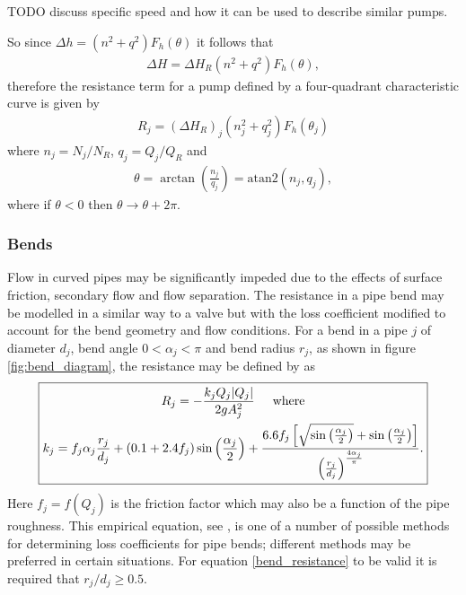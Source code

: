 \documentclass[12pt]{article}
\begin{document}
{\color{red} TODO discuss specific speed and how it can be used to describe similar pumps.}

So since $\Delta h = \left(n^2 + q^2 \right) F_h(\theta)$ it follows that 
\begin{align}
\Delta H = \Delta H_R \left(n^2 + q^2 \right) F_h(\theta),
\end{align}
therefore the resistance term for a pump defined by a four-quadrant characteristic curve is given by 
\begin{align}\label{pump_resistance}
\boxed{ R_j = \left( \Delta H_R \right)_j \left(n_j^2 + q_j^2 \right) F_h(\theta_j) }
\end{align}
where $n_j = N_j / N_R$, $q_j = Q_j / Q_R$ and 
\begin{align*}
\theta = \arctan\left(\frac{n_j}{q_j} \right) = \text{atan2}(n_j, q_j),
\end{align*}
where if $\theta < 0$ then $\theta \rightarrow \theta + 2 \pi$. 

\subsubsection{Bends} 

Flow in curved pipes may be significantly impeded due to the effects of surface friction, secondary flow and flow separation. The resistance in a pipe bend may be modelled in a similar way to a valve but with the loss coefficient modified to account for the bend geometry and flow conditions. For a bend in a pipe $j$ of diameter $d_j$, bend angle $0 < \alpha_j < \pi$ and bend radius $r_j$, as shown in figure \ref{fig:bend_diagram}, the resistance may be defined by as
\begin{align}\label{bend_resistance}
\boxed{
  \!\begin{gathered}
  R_j = - \frac{k_j Q_j|Q_j| }{2 g A_j^2} \hspace{0.5cm} \text{where}\\
  k_j = f_j \alpha_j \frac{r_j}{d_j}	 + (0.1 + 2.4 f_j) \sin \left( \frac{\alpha_j}{2} \right) + \frac{6.6 f_j \left[ \sqrt{\sin \left( \frac{\alpha_j}{2} \right) } + \sin \left( \frac{\alpha_j}{2} \right)  \right] }{\left(\frac{r_j}{d_j} \right)^{\frac{4 \alpha_j}{\pi}}}.
  \end{gathered}
}
\end{align}
Here $f_j = f(Q_j)$ is the friction factor which may also be a function of the pipe roughness. This empirical equation, see \cite{rennels22}, is one of a number of possible methods for determining loss coefficients for pipe bends; different methods may be preferred in certain situations. For equation \eqref{bend_resistance} to be valid it is required that $r_j / d_j \geq 0.5$.
\end{document}
